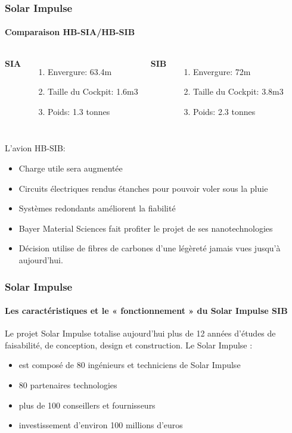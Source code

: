 \documentclass{beamer}
\begin{document}

\begin{frame}
\frametitle{Solar Impulse}
\framesubtitle{Comparaison HB-SIA/HB-SIB}

\begin{columns}[c] %

\textbf{SIA}
\begin{enumerate}
\item Envergure: 63.4m
\item Taille du Cockpit: 1.6m3
\item Poids: 1.3 tonnes
\end{enumerate}

\textbf{SIB}
\begin{enumerate}
\item Envergure: 72m
\item Taille du Cockpit: 3.8m3
\item Poids: 2.3 tonnes
\end{enumerate}

\end{columns}

L’avion HB-SIB:
\begin{itemize}
\item Charge utile sera augmentée
\item Circuits électriques rendus étanches pour pouvoir voler sous la pluie
\item Systèmes redondants améliorent la fiabilité
\item Bayer Material Sciences fait profiter le projet de ses nanotechnologies 
\item Décision utilise de fibres de carbones d’une légèreté jamais vues jusqu’à aujourd’hui.
\end{itemize}
\end{frame}




\begin{frame}
\frametitle{Solar Impulse}
\framesubtitle{Les caractéristiques et le  « fonctionnement » du Solar Impulse SIB}

Le projet Solar Impulse totalise aujourd’hui plus de 12 années d’études de faisabilité, de conception, design et construction. Le Solar Impulse :\\

\begin{itemize}
\item est composé de 80 ingénieurs et techniciens de Solar Impulse
\item 80 partenaires technologies
\item plus de 100 conseillers et fournisseurs
\item investissement d’environ 100 millions d’euros


\end{itemize}

\end{frame}
\end{document}
